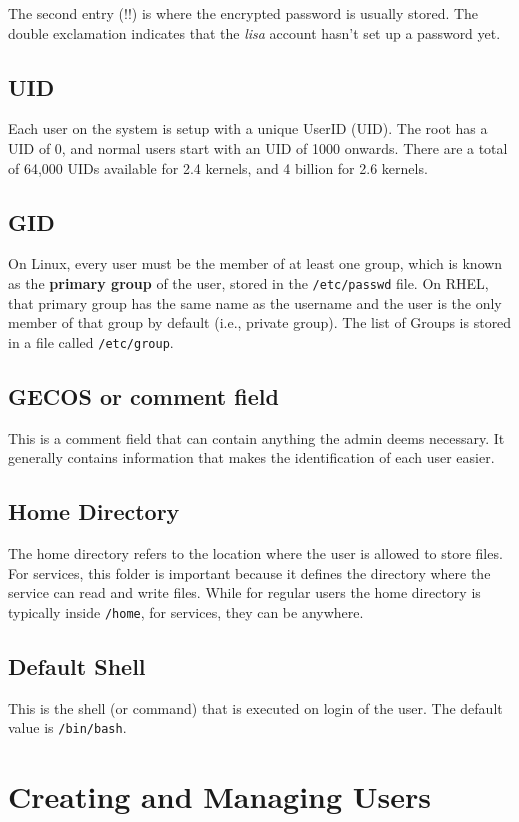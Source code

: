 \documentclass{report}
\begin{document}
	The second entry (!!) is where the encrypted password is usually stored. The double exclamation indicates that the \textit{lisa} account hasn't set up a password yet. 
	
	\subsection{UID}
	Each user on the system is setup with a unique UserID (UID). The root has a UID of 0, and normal users start with an UID of 1000 onwards. There are a total of 64,000 UIDs available for 2.4 kernels, and 4 billion for 2.6 kernels. 
	
	\subsection{GID}
	On Linux, every user must be the member of at least one group, which is known as the \textbf{primary group} of the user, stored in the \verb|/etc/passwd| file. On RHEL, that primary group has the same name as the username and the user is the only member of that group by default (i.e., private group). The list of Groups is stored in a file called \verb|/etc/group|.
	
	\subsection{GECOS or comment field}
	This is a comment field that can contain anything the admin deems necessary. It generally contains information that makes the identification of each user easier. 
	
	\subsection{Home Directory}
	The home directory refers to the location where the user is allowed to store files. For services, this folder is important because it defines the directory where the service can read and write files. While for regular users the home directory is typically inside \verb|/home|, for services, they can be anywhere.
	
	\subsection{Default Shell}
	This is the shell (or command) that is executed on login of the user. The default value is \verb|/bin/bash|.
	
	\section{Creating and Managing Users}
\end{document}
